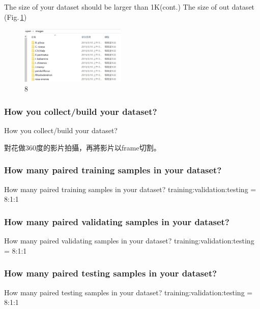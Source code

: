 \documentclass{beamer}
\begin{document}
\begin{frame}{The size of your dataset should be larger than 1K(cont.)}
The size of out dataset (Fig.\,\ref{fig:8})
 \begin{figure}
    \includegraphics[width=5cm]{dataset(2).png}
    \caption{8}
    \label{fig:8}
  \end{figure}

\end{frame}

\subsubsection{How you collect/build your dataset?}
\begin{frame}{How you collect/build your dataset?}
  \begin{CJK}{UTF8}{bkai}
	對花做360度的影片拍攝，再將影片以frame切割。
   \end{CJK}
\end{frame}

\subsubsection{How many paired training samples in your dataset?}
\begin{frame}{How many paired training samples in your dataset?}
training:validation:testing = 8:1:1
\end{frame}

\subsubsection{How many paired validating samples in your dataset?}
\begin{frame}{How many paired validating samples in your dataset?}
training:validation:testing = 8:1:1
\end{frame}

\subsubsection{How many paired testing samples in your dataset?}
\begin{frame}{How many paired testing samples in your dataset?}
training:validation:testing = 8:1:1
\end{frame}
\end{document}
